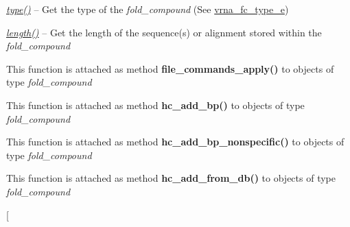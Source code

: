 \begin{DoxyRefList}
\begin{DoxyItemize}
\item {\itshape \mbox{\hyperlink{group__fold__compound_ac5eab693deac9a1a40c2a95ac294707c}{type()}}} -- Get the type of the {\itshape fold\+\_\+compound} (See \mbox{\hyperlink{group__fold__compound_ga01a4ff86fa71deaaa5d1abbd95a1447d}{vrna\+\_\+fc\+\_\+type\+\_\+e}})
\item {\itshape \mbox{\hyperlink{group__fold__compound_a95fbfed770b858e50c766505dc4bf998}{length()}}} -- Get the length of the sequence(s) or alignment stored within the {\itshape fold\+\_\+compound} 
\end{DoxyItemize}
\item[\label{wrappers__wrappers000001}%
\Hypertarget{wrappers__wrappers000001}%
Global \mbox{\hyperlink{commands_8h_adbe8c9622f7bcc6dcbe3448b98df8656}{vrna\+\_\+file\+\_\+commands\+\_\+apply}} (vrna\+\_\+fold\+\_\+compound\+\_\+t $\ast$vc, const char $\ast$filename, unsigned int options)]This function is attached as method {\bfseries file\+\_\+commands\+\_\+apply()} to objects of type {\itshape fold\+\_\+compound}  
\item[\label{wrappers__wrappers000006}%
\Hypertarget{wrappers__wrappers000006}%
Global \mbox{\hyperlink{group__hard__constraints_gac49305fc5c7d8653c5fbd2de1e1615e2}{vrna\+\_\+hc\+\_\+add\+\_\+bp}} (vrna\+\_\+fold\+\_\+compound\+\_\+t $\ast$vc, int i, int j, char option)]This function is attached as method {\bfseries hc\+\_\+add\+\_\+bp()} to objects of type {\itshape fold\+\_\+compound}  
\item[\label{wrappers__wrappers000005}%
\Hypertarget{wrappers__wrappers000005}%
Global \mbox{\hyperlink{group__hard__constraints_gadeb1083d0dc928e1e931065aae54ad82}{vrna\+\_\+hc\+\_\+add\+\_\+bp\+\_\+nonspecific}} (vrna\+\_\+fold\+\_\+compound\+\_\+t $\ast$vc, int i, int d, char option)]This function is attached as method {\bfseries hc\+\_\+add\+\_\+bp\+\_\+nonspecific()} to objects of type {\itshape fold\+\_\+compound}  
\item[\label{wrappers__wrappers000007}%
\Hypertarget{wrappers__wrappers000007}%
Global \mbox{\hyperlink{group__hard__constraints_ga5b4de3247b67358080c176b94591a8e6}{vrna\+\_\+hc\+\_\+add\+\_\+from\+\_\+db}} (vrna\+\_\+fold\+\_\+compound\+\_\+t $\ast$vc, const char $\ast$constraint, unsigned int options)]This function is attached as method {\bfseries hc\+\_\+add\+\_\+from\+\_\+db()} to objects of type {\itshape fold\+\_\+compound}  
\item[\label{wrappers__wrappers000004}%
%

\end{DoxyRefList}
